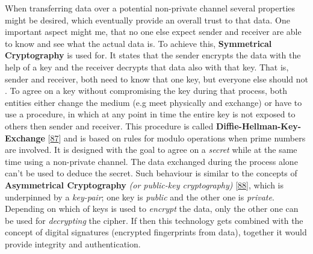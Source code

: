 \documentclass[12pt,english,a4paper,titlepage,cleardoublepage=empty,dottedtoc]{report}
\begin{document}
When transferring data over a potential non-private channel several
properties might be desired, which eventually provide an overall trust
to that data. One important aspect might me, that no one else expect
sender and receiver are able to know and see what the actual data is. To
achieve this, \textbf{Symmetrical Cryptography} is used for. It states
that the sender encrypts the data with the help of a key and the
receiver decrypts that data also with that key. That is, sender and
receiver, both need to know that one key, but everyone else should not .
To agree on a key without compromising the key during that process, both
entities either change the medium (e.g meet physically and exchange) or
have to use a procedure, in which at any point in time the entire key is
not exposed to others then sender and receiver. This procedure is called
\textbf{Diffie-Hellman-Key-Exchange}
{[}\protect\hyperlink{ref-paper_1976_d-h-key-exchange}{87}{]} and is
based on rules for modulo operations when prime numbers are involved. It
is designed with the goal to agree on a \emph{secret} while at the same
time using a non-private channel. The data exchanged during the process
alone can't be used to deduce the secret. Such behaviour is similar to
the concepts of
\textbf{\protect\hypertarget{link_asym-crypto}{}{Asymmetrical
Cryptography}} \emph{(or public-key cryptography)}
{[}\protect\hyperlink{ref-book_2014_chapter-9-1-public-key-crypto}{88}{]},
which is underpinned by a \emph{key-pair}; one key is \emph{public} and
the other one is \emph{private}. Depending on which of keys is used to
\emph{encrypt} the data, only the other one can be used for
\emph{decrypting} the cipher. If then this technology gets combined with
the concept of digital signatures (encrypted fingerprints from data),
together it would provide integrity and authentication.
\end{document}
